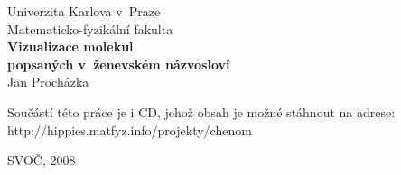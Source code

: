 \begin{titlepage}
\begin{center}
\large
Univerzita Karlova v~Praze\\
Matematicko-fyzikální fakulta\\
\vspace{35mm}
{\Large\bf Vizualizace molekul \\ popsaných v~ženevském názvosloví}\\
\vspace{5mm}
{\Large Jan Procházka}\\
\vspace{15mm}

\end{center}
\vfill

{
\small 
\noindent
Součástí této práce je i CD, jehož obsah je možné stáhnout na adrese: \\
http://hippies.matfyz.info/projekty/chenom
}
\vspace{5mm}
\begin{center}
SVOČ, 2008
\end{center}

\end{titlepage} %

\normalsize %
\setcounter{page}{2} %
\vspace{\fill}

